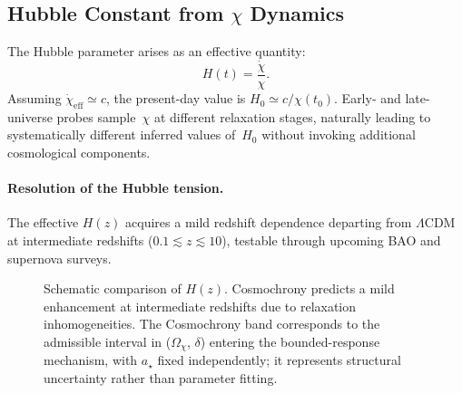 \subsection{Hubble Constant from
\texorpdfstring{$\chi$}{χ} Dynamics}
  \label{subsec:hubble-constant-from-chi-dynamics}

  The Hubble parameter arises as an effective quantity:
  \begin{equation}
    H(t) = \frac{\dot{\chi}}{\chi}.
  \end{equation}
  Assuming $\dot{\chi}_{\mathrm{eff}} \simeq c$, the present-day value is
  $H_0 \simeq c/\chi(t_0)$.
  Early- and late-universe probes sample~$\chi$ at different relaxation
  stages, naturally leading to systematically different inferred values
  of~$H_0$ without invoking additional cosmological components.

  \paragraph{Resolution of the Hubble tension.}
    The effective $H(z)$ acquires a mild redshift dependence departing from
    $\Lambda$CDM at intermediate redshifts
    ($0.1 \lesssim z \lesssim 10$), testable through upcoming BAO and
    supernova surveys.

    \begin{figure}[t]
      \centering
      \caption{Schematic comparison of $H(z)$.
      Cosmochrony predicts a mild enhancement at intermediate
      redshifts due to relaxation inhomogeneities. The Cosmochrony band corresponds to the admissible interval in
        ($\Omega_{\chi}$, $\delta$) entering the bounded-response mechanism,
        with $a_{\star}$ fixed independently; it represents structural uncertainty rather than parameter fitting.}
      \label{fig:hubble-comparison}
    \end{figure}
